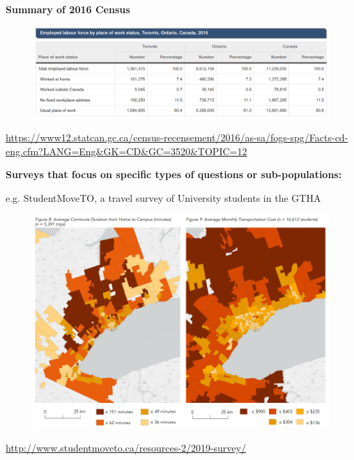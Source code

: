 \documentclass[aspectratio=169]{beamer}
\begin{document}
\begin{frame}
	
	\textbf{Summary of 2016 Census}
	
	\begin{figure}
		\centering
		\includegraphics[width=1\linewidth]{images/tor_emp_2016.png}
	\end{figure}
	
	\tiny\url{https://www12.statcan.gc.ca/census-recensement/2016/as-sa/fogs-spg/Facts-cd-eng.cfm?LANG=Eng\&GK=CD\&GC=3520\&TOPIC=12}
	
	
\end{frame}








\begin{frame}
	
	\textbf{Surveys that focus on specific types of questions or sub-populations:}
	\vspace{2mm}
	
	e.g. StudentMoveTO, a travel survey of University students in the GTHA
	
	\begin{figure}
		\centering
		\includegraphics[width=0.7\linewidth]{images/smto_maps.png}
	\end{figure}
	
	\tiny\url{http://www.studentmoveto.ca/resources-2/2019-survey/}
	
\end{frame}
\end{document}
